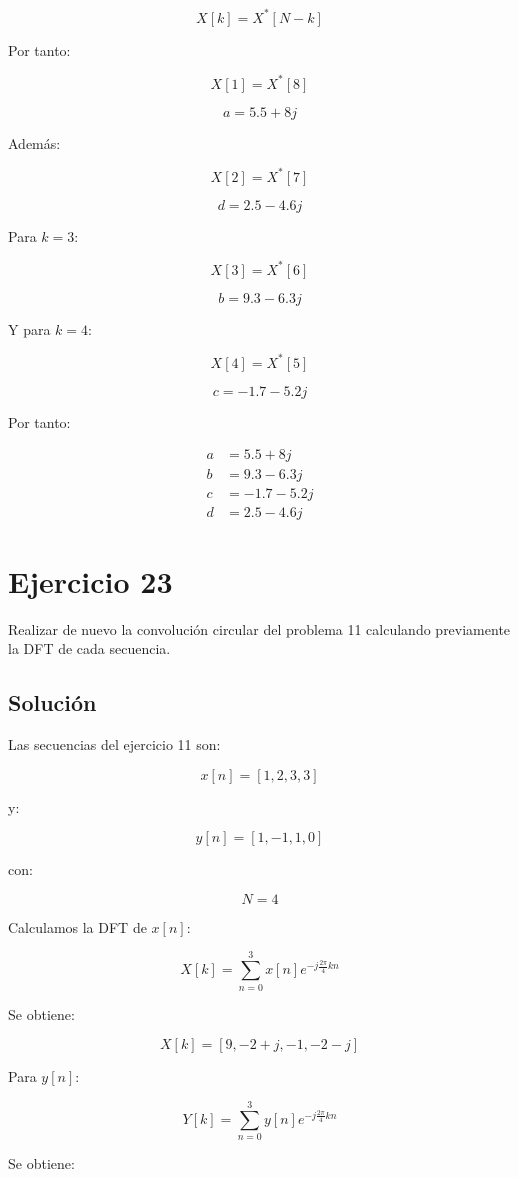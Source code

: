 \documentclass[fleqn]{article}
\begin{document}
	\[
	X[k]
	=
	X^*[N-k]
	\]

	Por tanto:

	\[
	X[1]
	=
	X^*[8]
	\]

	\[
	a
	=
	5.5+8j
	\]

	Además:

	\[
	X[2]
	=
	X^*[7]
	\]

	\[
	d
	=
	2.5-4.6j
	\]

	Para $k=3$:

	\[
	X[3]
	=
	X^*[6]
	\]

	\[
	b
	=
	9.3-6.3j
	\]

	Y para $k=4$:

	\[
	X[4]
	=
	X^*[5]
	\]

	\[
	c
	=
	-1.7-5.2j
	\]

	Por tanto:

	\[
	\boxed{
	\begin{aligned}
	a&=5.5+8j\\
	b&=9.3-6.3j\\
	c&=-1.7-5.2j\\
	d&=2.5-4.6j
	\end{aligned}
	}
	\]

\section{Ejercicio 23}
	Realizar de nuevo la convolución circular del problema 11 calculando previamente la DFT de cada secuencia.

	\subsection{Solución}

	Las secuencias del ejercicio 11 son:

	\[
	x[n]=[1,2,3,3]
	\]

	y:

	\[
	y[n]=[1,-1,1,0]
	\]

	con:

	\[
	N=4
	\]

	Calculamos la DFT de $x[n]$:

	\[
	X[k]
	=
	\sum_{n=0}^{3}
	x[n]e^{-j\frac{2\pi}{4}kn}
	\]

	Se obtiene:

	\[
	\boxed{
	X[k]=[9,-2+j,-1,-2-j]
	}
	\]

	Para $y[n]$:

	\[
	Y[k]
	=
	\sum_{n=0}^{3}
	y[n]e^{-j\frac{2\pi}{4}kn}
	\]

	Se obtiene:
\end{document}
